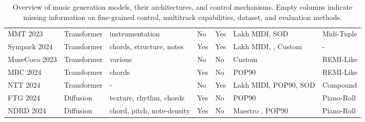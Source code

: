 \begin{table}[H]
\begin{tabular}{|p{2.5cm}|p{1.8cm}|p{3cm}|p{1cm}|p{1cm}|p{3cm}|p{2.5cm}|}
        MMT 2023 \cite{Dong_Chen_MMT_Kirkpatrick_2023} & Transformer & instrumentation & No & Yes & Lakh MIDI\cite{Raffel_2016}, SOD \cite{Crestel_OrchestralDataset} & Midi-Tuple \\
        Sympack 2024 \cite{Chen_Smith_Spijkervet_Wang_Zou_Li_Kong_Du_2024} & Transformer & chords, structure, notes & Yes & Yes & Lakh MIDI\cite{Raffel_2016}, \cite{Bertin-Mahieux_Ellis_Whitman_Lamere_2011}, Custom & -\\
        MuseCoco 2023 \cite{Lu_Xu_Kang_Yu_Xing_Tan_Bian_MuseCoco_2023} & Transformer & various & No & No & Custom & REMI-Like\\
        MBC 2024 \cite{Shu_Xu_Musebarcontrol_2024} & Transformer & chords & Yes & No & POP90\cite{Wang_Chen_pop90_dataset} & REMI-Like\\
        NTT 2024\cite{Ryu_Dong_nested_2024} & Transformer & - & No  & Yes & Lakh MIDI\cite{Raffel_2016}, POP90\cite{Wang_Chen_pop90_dataset}, SOD\cite{Crestel_OrchestralDataset} & Compound\\
        FTG 2024\cite{Zhu_Liu_Jiang_Zheng_texture_2024} & Diffusion & texture, rhythm, chords & Yes & No & POP90 \cite{Wang_Chen_pop90_dataset} & Piano-Roll \\
        NDRD 2024\cite{Huang_rule_diffusion_2024} & Diffusion & chord, pitch, note-density & Yes & No & Maestro \cite{hawthorne2018maestro}, POP90\cite{Wang_Chen_pop90_dataset} & Piano-Roll \\
        \hline
    \end{tabular}
    \caption{Overview of music generation models, their architectures, and control mechanisms. Empty columns indicate missing information on fine-grained control, multitrack capabilities, dataset, and evaluation methods.}
    \label{tab:music_models}
\end{table}


